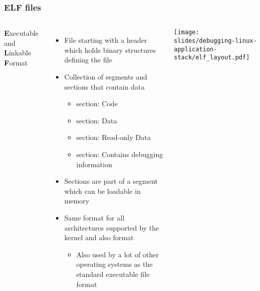 \begin{frame}
  \frametitle{ELF files}
  \begin{columns}
           {\bf E}xecutable and {\bf L}inkable {\bf F}ormat
      \begin{itemize}
        \item File starting with a header which holds binary structures
              defining the file
        \item Collection of segments and sections that contain data
        \begin{itemize}
          \item {} section: Code
          \item {} section: Data
          \item {} section: Read-only Data
          \item {} section: Contains debugging information
        \end{itemize}
        \item Sections are part of a segment which can be loadable in memory
        \item Same format for all architectures supported by the kernel and also
               format
        \begin{itemize}
          \item Also used by a lot of other operating systems as the standard
                executable file format
        \end{itemize}
      \end{itemize}
      \vspace{0.5cm}
      \texttt{[image: slides/debugging-linux-application-stack/elf\_layout.pdf]}
  \end{columns}
\end{frame}

